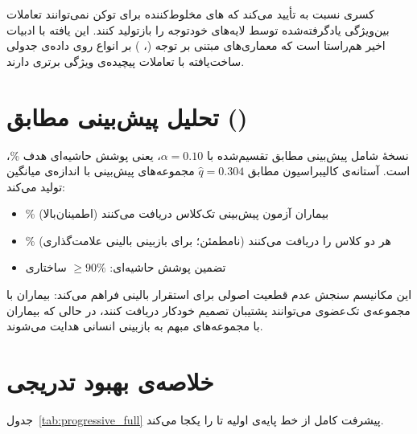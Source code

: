 کسری    نسبت به  تأیید می‌کند که های مخلوط‌کننده برای توکن نمی‌توانند تعاملات بین‌ویژگی یادگرفته‌شده توسط لایه‌های خودتوجه را بازتولید کنند. این یافته با ادبیات اخیر هم‌راستا است که معماری‌های مبتنی بر توجه (، ) بر انواع  روی داده‌ی جدولی ساخت‌یافته با تعاملات پیچیده‌ی ویژگی برتری دارند.

\section{تحلیل پیش‌بینی مطابق ()}

نسخۀ  شامل پیش‌بینی مطابق تقسیم‌شده با $\alpha = 0.10$، یعنی پوشش حاشیه‌ای هدف \%، است. آستانه‌ی کالیبراسیون مطابق $\hat{q} = 0.304$ مجموعه‌های پیش‌بینی با اندازه‌ی میانگین  تولید می‌کند:

\begin{itemize}
\item {}\% بیماران آزمون پیش‌بینی تک‌کلاس دریافت می‌کنند (اطمینان‌بالا)
\item {}\% هر دو کلاس را دریافت می‌کنند (نامطمئن؛ برای بازبینی بالینی علامت‌گذاری)
\item تضمین پوشش حاشیه‌ای: $\geq 90\%$ ساختاری
\end{itemize}

این مکانیسم سنجش عدم قطعیت اصولی برای استقرار بالینی فراهم می‌کند: بیماران با مجموعه‌ی تک‌عضوی می‌توانند پشتیبان تصمیم خودکار دریافت کنند، در حالی که بیماران با مجموعه‌های مبهم به بازبینی انسانی هدایت می‌شوند.

\section{خلاصه‌ی بهبود تدریجی}

جدول~\ref{tab:progressive_full} پیشرفت کامل از خط پایه‌ی اولیه تا  را یکجا می‌کند.

